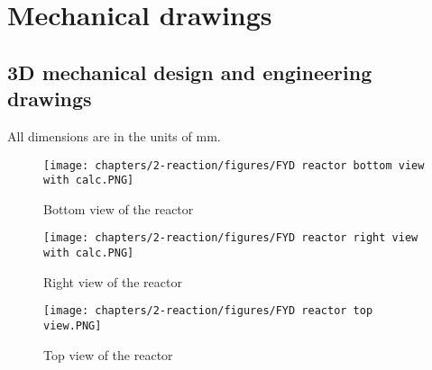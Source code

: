 \section{Mechanical drawings}
\label{app:reactor-drawings}
\subsection{3D mechanical design and engineering drawings}
\label{app:engineeringdesign}
All dimensions are in the units of mm.

\begin{figure}
    \centering
    \texttt{[image: chapters/2-reaction/figures/FYD reactor bottom view with calc.PNG]}
    \caption{Bottom view of the reactor}
    \label{fig:reactorbottom}
    \texttt{[image: chapters/2-reaction/figures/FYD reactor right view with calc.PNG]}
    \caption{Right view of the reactor}
    \label{fig:reactorright}
    \texttt{[image: chapters/2-reaction/figures/FYD reactor top view.PNG]}
    \caption{Top view of the reactor}
    \label{fig:reactortop}
\end{figure}

